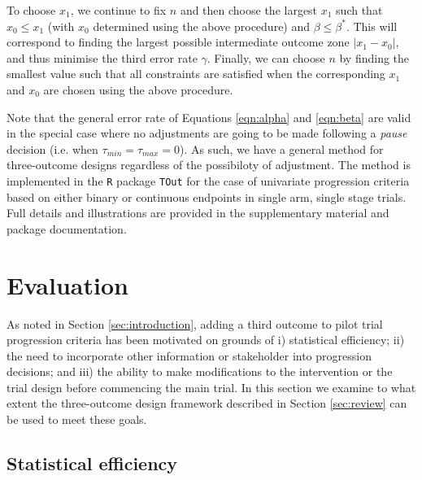 \documentclass{bmcart}
\begin{document}
To choose $x_1$, we continue to fix $n$ and then choose the largest $x_1$ such that $x_0 \leq x_1$ (with $x_0$ determined using the above procedure) and $\beta \leq \beta^*$. This will correspond to finding the largest possible intermediate outcome zone $|x_1 - x_0|$, and thus minimise the third error rate $\gamma$. Finally, we can choose $n$ by finding the smallest value such that all constraints are satisfied when the corresponding $x_1$ and $x_0$ are chosen using the above procedure.

Note that the general error rate of Equations \ref{eqn:alpha} and \ref{eqn:beta} are valid in the special case where no adjustments are going to be made following a \emph{pause} decision (i.e. when $\tau_{min} = \tau_{max} = 0$). As such, we have a general method for three-outcome designs regardless of the possibiloty of adjustment. The method is implemented in the \texttt{R} package \texttt{TOut} for the case of univariate progression criteria based on either binary or continuous endpoints in single arm, single stage trials. Full details and illustrations are provided in the supplementary material and package documentation.

\section{Evaluation}\label{sec:methods}

As noted in Section \ref{sec:introduction}, adding a third outcome to pilot trial progression criteria has been motivated on grounds of i) statistical efficiency; ii) the need to incorporate other information or stakeholder into progression decisions; and iii) the ability to make modifications to the intervention or the trial design before commencing the main trial. In this section we examine to what extent the three-outcome design framework described in Section \ref{sec:review} can be used to meet these goals.

\subsection{Statistical efficiency}\label{sec:efficiency}
\end{document}
